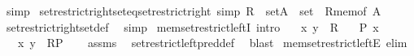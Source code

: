 \begin{isabellebody}
\ simp%
\endisatagproof
{\isafoldproof}%
%
\isadelimproof
\isanewline
%
\endisadelimproof
\isanewline
{}\isamarkupfalse%
\ set{\isacharunderscore}{\kern0pt}restrict{\isacharunderscore}{\kern0pt}right{\isacharunderscore}{\kern0pt}set{\isacharunderscore}{\kern0pt}eq{\isacharunderscore}{\kern0pt}set{\isacharunderscore}{\kern0pt}restrict{\isacharunderscore}{\kern0pt}right\ {\isacharbrackleft}{\kern0pt}simp{\isacharbrackright}{\kern0pt}{\isacharcolon}{\kern0pt}\ {\isachardoublequoteopen}{\isacharparenleft}{\kern0pt}R\ {\isacharcolon}{\kern0pt}{\isacharcolon}{\kern0pt}\ set{\isacharparenright}{\kern0pt}{\isasymupharpoonleft}\isactrlbsub A\ {\isacharcolon}{\kern0pt}{\isacharcolon}{\kern0pt}\ set\isactrlesub \ {\isacharequal}{\kern0pt}\ R{\isasymupharpoonleft}\isactrlbsub mem{\isacharunderscore}{\kern0pt}of\ A\isactrlesub {\isachardoublequoteclose}\isanewline
%
\isadelimproof
\ \ %
\endisadelimproof
%
\isatagproof
{}\isamarkupfalse%
\ set{\isacharunderscore}{\kern0pt}restrict{\isacharunderscore}{\kern0pt}right{\isacharunderscore}{\kern0pt}set{\isacharunderscore}{\kern0pt}def\ \isamarkupfalse%
\ simp%
\endisatagproof
{\isafoldproof}%
%
\isadelimproof
\isanewline
%
\endisadelimproof
\isanewline
{}\isamarkupfalse%
\ mem{\isacharunderscore}{\kern0pt}set{\isacharunderscore}{\kern0pt}restrict{\isacharunderscore}{\kern0pt}leftI\ {\isacharbrackleft}{\kern0pt}intro{\isacharbang}{\kern0pt}{\isacharbrackright}{\kern0pt}{\isacharcolon}{\kern0pt}\isanewline
\ \ \ {\isachardoublequoteopen}{\isasymlangle}x{\isacharcomma}{\kern0pt}\ y{\isasymrangle}\ {\isasymin}\ R{\isachardoublequoteclose}\isanewline
\ \ \ {\isachardoublequoteopen}P\ x{\isachardoublequoteclose}\isanewline
\ \ \ {\isachardoublequoteopen}{\isasymlangle}x{\isacharcomma}{\kern0pt}\ y{\isasymrangle}\ {\isasymin}\ R{\isasymrestriction}\isactrlbsub P\isactrlesub {\isachardoublequoteclose}\isanewline
%
\isadelimproof
\ \ %
\endisadelimproof
%
\isatagproof
{}\isamarkupfalse%
\ assms\ \isamarkupfalse%
\ set{\isacharunderscore}{\kern0pt}restrict{\isacharunderscore}{\kern0pt}left{\isacharunderscore}{\kern0pt}pred{\isacharunderscore}{\kern0pt}def\ \isamarkupfalse%
\ blast%
\endisatagproof
{\isafoldproof}%
%
\isadelimproof
\isanewline
%
\endisadelimproof
\isanewline
{}\isamarkupfalse%
\ mem{\isacharunderscore}{\kern0pt}set{\isacharunderscore}{\kern0pt}restrict{\isacharunderscore}{\kern0pt}leftE\ {\isacharbrackleft}{\kern0pt}elim{\isacharbrackright}{\kern0pt}{\isacharcolon}{\kern0pt}\isanewline

\end{isabellebody}

